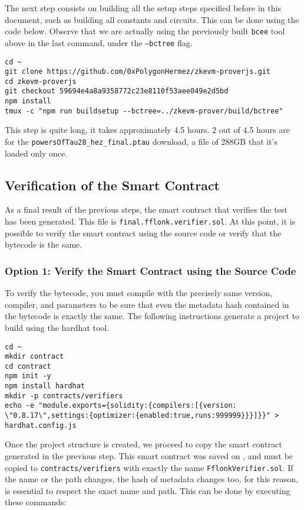 The next step consists on building all the setup steps specified before in this document, such as building all constants and circuits. This can be done using the code below. Observe that we are actually using the previously built \texttt{bcee} tool above in the last command, under the \texttt{--bctree} flag.

\begin{lstlisting}[style=termt]
cd ~
git clone https://github.com/0xPolygonHermez/zkevm-proverjs.git
cd zkevm-proverjs
git checkout 59694e4a8a9358772c23e8110f53aee049e2d5bd
npm install
tmux -c "npm run buildsetup --bctree=../zkevm-prover/build/bctree"
\end{lstlisting}

This step is quite long, it takes approximately 4.5 hours. 2 out of 4.5 hours are for the \texttt{powersOfTau28\_hez\_final.ptau} download, a file of 288GB that it’s loaded only once.

\subsection{Verification of the Smart Contract}

As a final result of the previous steps, the smart contract that verifies the test has been generated. This file is \texttt{final.fflonk.verifier.sol}. At this point, it is possible to verify the smart contract using the source code or verify that the bytecode is the same. 

\subsubsection{Option 1: Verify the Smart Contract using the Source Code}

To verify the bytecode, you must compile with the precisely same version, compiler, and parameters to be sure that even the metadata hash contained in the bytecode is exactly the same. The following instructions generate a project to build using the hardhat tool.

\begin{lstlisting}[style=termt]
cd ~
mkdir contract
cd contract
npm init -y 
npm install hardhat
mkdir -p contracts/verifiers
echo -e "module.exports={solidity:{compilers:[{version: \"0.8.17\",settings:{optimizer:{enabled:true,runs:999999}}}]}}" > hardhat.config.js
\end{lstlisting}

Once the project structure is created, we proceed to copy the smart contract generated in the previous step. This smart contract was saved on , and must be copied to \texttt{contracts/verifiers} with exactly the name \texttt{FflonkVerifier.sol}. If the name or the path changes, the hash of metadata changes too, for this reason, is essential to respect the exact name and path. This can be done by executing these commands:

